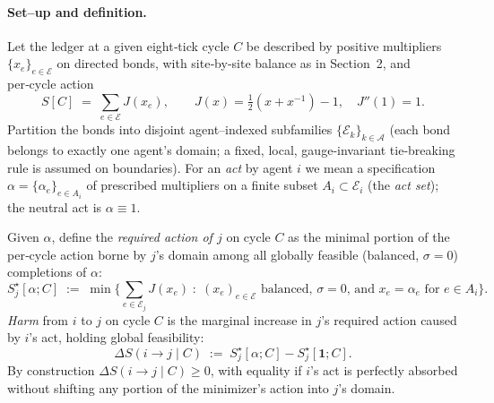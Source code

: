 \documentclass[11pt]{article}
\begin{document}
\paragraph{Set–up and definition.}
Let the ledger at a given eight‑tick cycle $C$ be described by positive multipliers $\{x_e\}_{e\in\mathcal E}$ on directed bonds, with site‑by‑site balance as in Section~2, and per‑cycle action
\[
S[C]\;=\;\sum_{e\in\mathcal E} J(x_e),\qquad
J(x)=\tfrac12(x+x^{-1})-1,\quad J''(1)=1.
\]
Partition the bonds into disjoint agent–indexed subfamilies $\{\mathcal E_k\}_{k\in\mathcal A}$ (each bond belongs to exactly one agent’s domain; a fixed, local, gauge‑invariant tie‑breaking rule is assumed on boundaries). For an \emph{act} by agent $i$ we mean a specification $\alpha=\{\alpha_e\}_{e\in A_i}$ of prescribed multipliers on a finite subset $A_i\subset\mathcal E_i$ (the \emph{act set}); the neutral act is $\alpha\equiv 1$.

Given $\alpha$, define the \emph{required action of $j$} on cycle $C$ as the minimal portion of the per‑cycle action borne by $j$’s domain among all globally feasible (balanced, $\sigma=0$) completions of $\alpha$:
\begin{equation}
S_j^\star[\alpha;C]
\;:=\;
\min\Big\{
\sum_{e\in\mathcal E_j} J(x_e)\;:\;
\text{$(x_e)_{e\in\mathcal E}$ balanced,\ $\sigma=0$,\ and $x_e=\alpha_e$ for $e\in A_i$}
\Big\}.
\label{eq:required-action}
\end{equation}
\emph{Harm} from $i$ to $j$ on cycle $C$ is the marginal increase in $j$’s required action caused by $i$’s act, holding global feasibility:
\begin{equation}
\Delta S(i\!\to\! j\mid C)\;:=\;S_j^\star[\alpha;C]-S_j^\star[\mathbf 1;C].
\label{eq:def-ds}
\end{equation}
By construction $\Delta S(i\!\to\! j\mid C)\ge 0$, with equality if $i$’s act is perfectly absorbed without shifting any portion of the minimizer’s action into $j$’s domain.
\end{document}
